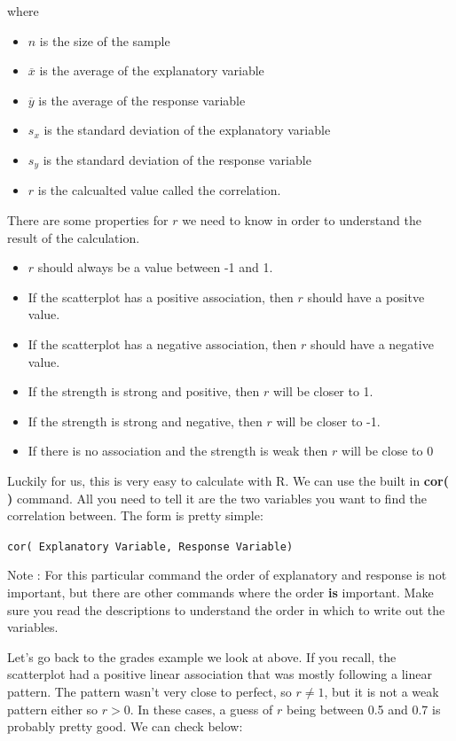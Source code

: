 \documentclass[
  letterpaper,
  DIV=11,
  numbers=noendperiod]{scrreprt}
\providecommand{\tightlist}{%
  \setlength{\itemsep}{0pt}\setlength{\parskip}{0pt}}\usepackage{longtable,booktabs,array}
\begin{document}
where

\begin{itemize}
\tightlist
\item
  \(n\) is the size of the sample
\item
  \(\overline{x}\) is the average of the explanatory variable
\item
  \(\overline{y}\) is the average of the response variable
\item
  \(s_x\) is the standard deviation of the explanatory variable
\item
  \(s_y\) is the standard deviation of the response variable
\item
  \(r\) is the calcualted value called the correlation.
\end{itemize}

There are some properties for \(r\) we need to know in order to
understand the result of the calculation.

\begin{itemize}
\tightlist
\item
  \(r\) should always be a value between -1 and 1.
\item
  If the scatterplot has a positive association, then \(r\) should have
  a positve value.
\item
  If the scatterplot has a negative association, then \(r\) should have
  a negative value.
\item
  If the strength is strong and positive, then \(r\) will be closer to
  1.
\item
  If the strength is strong and negative, then \(r\) will be closer to
  -1.
\item
  If there is no association and the strength is weak then \(r\) will be
  close to \(0\)
\end{itemize}

Luckily for us, this is very easy to calculate with R. We can use the
built in \textbf{cor( )} command. All you need to tell it are the two
variables you want to find the correlation between. The form is pretty
simple:

\texttt{cor(\ Explanatory\ Variable,\ Response\ Variable)}

Note : For this particular command the order of explanatory and response
is not important, but there are other commands where the order
\textbf{is} important. Make sure you read the descriptions to understand
the order in which to write out the variables.

Let's go back to the grades example we look at above. If you recall, the
scatterplot had a positive linear association that was mostly following
a linear pattern. The pattern wasn't very close to perfect, so
\(r \neq 1\), but it is not a weak pattern either so \(r > 0\). In these
cases, a guess of \(r\) being between 0.5 and 0.7 is probably pretty
good. We can check below:
\end{document}
